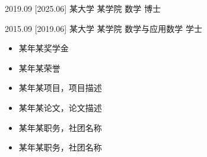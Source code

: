 \documentclass[zh]{resume}
\begin{document}
\makeheader

\begin{competences}
\end{competences}

\begin{educations}
  \education%
    {2019.09}%
    [2025.06]%
    {某大学}%
    {某学院}%
    {数学}%
    {博士}

  \separator{0.5ex}
  \education%
    {2015.09}%
    [2019.06]%
    {某大学}%
    {某学院}%
    {数学与应用数学}%
    {学士}
\end{educations}

\begin{itemize}
  \item 某年某奖学金
  \item 某年某荣誉
\end{itemize}

\begin{itemize}
	\item 某年某项目，项目描述
	\item 某年某论文，论文描述
\end{itemize}

\begin{itemize}
	\item 某年某职务，社团名称
	\item 某年某职务，社团名称
\end{itemize}
\end{document}
